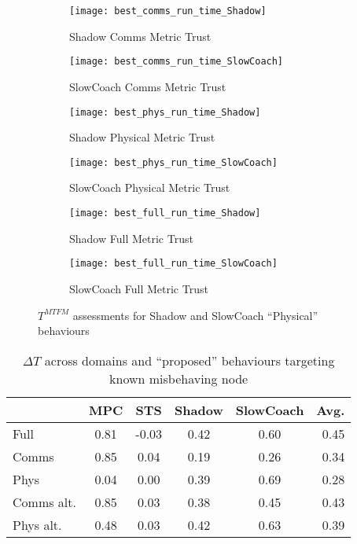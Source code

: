 \begin{figure}
	\begin{subfigure}[b]{0.5\textwidth}
		\centering
		\texttt{[image: best\_comms\_run\_time\_Shadow]}
		\caption{Shadow Comms Metric Trust}
		\label{fig:comms_time_shadow}
	\end{subfigure}
	\begin{subfigure}[b]{0.5\textwidth}
		\centering
		\texttt{[image: best\_comms\_run\_time\_SlowCoach]}
		\caption{SlowCoach Comms Metric Trust}
		\label{fig:comms_time_slowcoach}
	\end{subfigure}
	
	\begin{subfigure}[b]{0.5\textwidth}
		\centering
		\texttt{[image: best\_phys\_run\_time\_Shadow]}
		\caption{Shadow Physical Metric Trust }
		\label{fig:phys_time_shadow}
	\end{subfigure}
	\begin{subfigure}[b]{0.5\textwidth}
		\centering
		\texttt{[image: best\_phys\_run\_time\_SlowCoach]}
		\caption{SlowCoach Physical Metric Trust}
		\label{fig:phys_time_slowcoach}
	\end{subfigure}
		
	\begin{subfigure}[b]{0.5\textwidth}
		\centering
		\texttt{[image: best\_full\_run\_time\_Shadow]}
		\caption{Shadow Full Metric Trust }
		\label{fig:full_time_shadow}
	\end{subfigure}
	\begin{subfigure}[b]{0.5\textwidth}
		\centering
		\texttt{[image: best\_full\_run\_time\_SlowCoach]}
		\caption{SlowCoach Full Metric Trust}
		\label{fig:full_time_slowcoach}
	\end{subfigure}
	\caption{$T^{MTFM}$ assessments for Shadow and SlowCoach ``Physical'' behaviours}
	\label{fig:trust_shadow_slowcoach}
\end{figure}



	
\begin{table}
	\centering
	\caption{$\Delta T$ across domains and ``proposed'' behaviours targeting known misbehaving node}
	\begin{tabular}{|l|*{4}{c}|r|}
		\toprule
		\diagbox{Domain}{Behaviour} &  MPC &   STS &  Shadow &  SlowCoach &  Avg. \\
		\midrule
		Full       & 0.81 & -0.03 &    0.42 &       0.60 &  0.45 \\
		Comms      & 0.85 &  0.04 &    0.19 &       0.26 &  0.34 \\
		Phys       & 0.04 &  0.00 &    0.39 &       0.69 &  0.28 \\
		Comms alt. & 0.85 &  0.03 &    0.38 &       0.45 &  0.43 \\
		Phys alt.  & 0.48 &  0.03 &    0.42 &       0.63 &  0.39 \\
		\bottomrule
	\end{tabular}
	\label{tab:domain_deltas}
\end{table}

